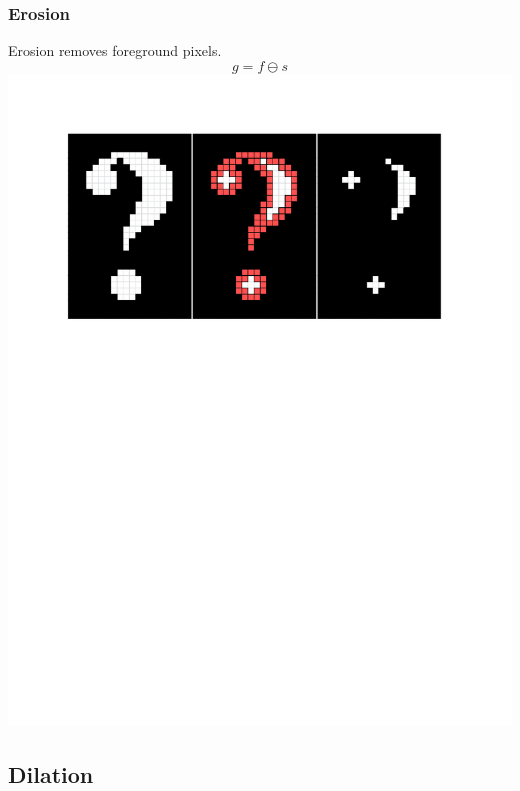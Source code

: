 \documentclass{beamer}
\begin{document}
\begin{frame}
\frametitle{Erosion}
\begin{center}
Erosion removes foreground pixels.
\begin{equation*}
g = f \ominus s
\end{equation*}
\includegraphics[width=1\textwidth,trim={0 0 0 0.5in},clip]{erosion}
\end{center}
\end{frame}

\subsection[Dilation]{Dilation}
\end{document}

